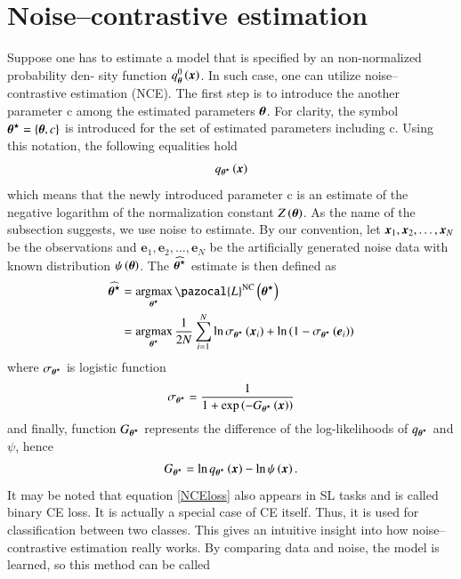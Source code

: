 \section{Noise--contrastive estimation}
Suppose one has to estimate a model that is specified by an non-normalized probability den-
sity function $q^0_{\boldsymbol{\theta}}\left(\boldsymbol{x}\right)$. In such case, one can utilize noise--contrastive estimation (NCE). The first step is to  introduce the another parameter c among the estimated parameters $\boldsymbol{\theta}$. For clarity, the symbol $\boldsymbol{\theta}^\star=\left\lbrace\boldsymbol{\theta},c\right\rbrace$ is introduced for the set of estimated parameters including
c. Using this notation, the following equalities hold
\begin{align}
    q_{\boldsymbol{\theta}^\star}\left(\boldsymbol{x}\right)
    \end{align}
which means that the newly introduced parameter c is an estimate of the negative logarithm of
the normalization constant $Z\left(\boldsymbol{\theta}\right)$.
As the name of the subsection suggests, we use noise to estimate. By our convention, let $\boldsymbol{x}_1,\boldsymbol{x}_2,\dots,\boldsymbol{x}_N$
be the observations and $\boldsymbol{e}_1,\boldsymbol{e}_2,\dots,\boldsymbol{e}_N$ be the artificially generated noise data with known distribution $\psi\left(\boldsymbol{\theta}\right)$. The $\widehat{\boldsymbol{\theta}^\star}$ estimate is then defined as
\begin{align}
    \widehat{\bt^\star} &= \argmax_{\bt^\star} \pazocal{L}^{\mathrm{NC}}\left(\bt^\star\right)\\
   &= \argmax_{\bt^\star} \frac{1}{2N}\sum_{i=1}^N \ln\sigma_{\bt^\star}\left(\bx_i\right) + \ln\left(1-\sigma_{\bt^\star}\left(\boldsymbol{e}_i\right) \right)\label{NCEloss}
\end{align}
where $\sigma_{\boldsymbol{\theta}^\star}$ is logistic function
\begin{align}
\sigma_{\boldsymbol{\theta}^\star} = \frac{1}{1 + \exp\left(-G_{\boldsymbol{\theta}^\star}\left(\boldsymbol{x}\right) \right)}
\end{align}
and finally, function $G_{\boldsymbol{\theta}^\star}$ represents the difference of the log-likelihoods of $q_{\boldsymbol{\theta}^\star}$ and $\psi$, hence
\begin{align}
    G_{\boldsymbol{\theta}^\star} = \ln q_{\boldsymbol{\theta}^\star}\left(\boldsymbol{x} \right) - \ln\psi\left(\boldsymbol{x} \right).
\end{align}
It may be noted that equation \eqref{NCEloss} also appears in SL tasks and is called binary
CE loss. It is actually a special case of CE itself. Thus, it is used for classification between two classes. This gives an intuitive insight into how noise--contrastive estimation
really works. By comparing data and noise, the model is learned, so this method can be called
